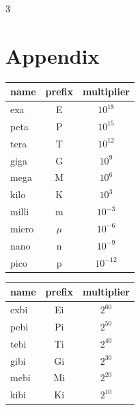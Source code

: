 \documentclass[12pt, a4paper]{article}
\begin{document}
\begin{multicols*}{3}
\section*{Appendix}
\begin{tabular}{|l c c|}
\hline
\textbf{name} & \textbf{prefix} & \textbf{multiplier} \\
\hline
exa  & E  & $10^{18}$ \\
peta & P  & $10^{15}$ \\
tera & T  & $10^{12}$ \\
giga & G  & $10^{9}$  \\
mega & M  & $10^{6}$  \\
kilo & K  & $10^{3}$  \\
\hline
milli & m  & $10^{-3}$ \\
micro & $\mu$ & $10^{-6}$ \\
nano  & n  & $10^{-9}$ \\
pico  & p  & $10^{-12}$ \\
\hline
\end{tabular}
\begin{tabular}{|l c c|}
\hline
\textbf{name} & \textbf{prefix} & \textbf{multiplier} \\
\hline
exbi & Ei & $2^{60}$ \\
pebi & Pi & $2^{50}$ \\
tebi & Ti & $2^{40}$ \\
gibi & Gi & $2^{30}$ \\
mebi & Mi & $2^{20}$ \\
kibi & Ki & $2^{10}$ \\
\hline
\end{tabular}
\end{multicols*}
\end{document}
